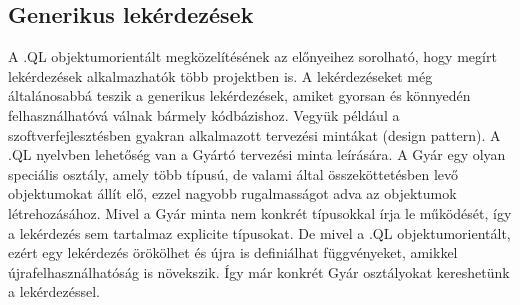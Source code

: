 \documentclass[a4paper,12pt]{report}
\begin{document}
\subsection{Generikus lekérdezések}
\par A .QL objektumorientált megközelítésének az előnyeihez sorolható, hogy megírt lekérdezések alkalmazhatók több projektben is. A lekérdezéseket még általánosabbá teszik a generikus lekérdezések, amiket gyorsan és könnyedén felhasználhatóvá válnak bármely kódbázishoz. Vegyük például a szoftverfejlesztésben gyakran alkalmazott tervezési mintákat (design pattern). A .QL nyelvben lehetőség van a Gyártó tervezési minta leírására. A Gyár egy olyan speciális osztály, amely több típusú, de valami által összeköttetésben levő objektumokat állít elő, ezzel nagyobb rugalmasságot adva az objektumok létrehozásához. Mivel a Gyár minta nem konkrét típusokkal írja le működését, így a lekérdezés sem tartalmaz explicite típusokat. De mivel a .QL objektumorientált, ezért egy lekérdezés örökölhet és újra is definiálhat függvényeket, amikkel újrafelhasználhatóság is növekszik. Így már konkrét Gyár osztályokat kereshetünk a lekérdezéssel.
\end{document}
